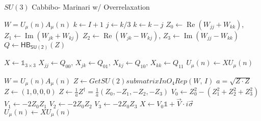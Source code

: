 \documentclass[a4paper,10pt]{article}
\begin{document}
\begin{algorithm}[H]
\caption{$SU(3)$ Cabbibo- Marinari w/ Overrelaxation}\label{alg:HBplusOR}
\begin{algorithmic}



\State $W = U_\mu(n)A_\mu(n)$
  \State $k \gets I+1$
\State $j \gets k / 3$ 
\State $k \gets k - j$ 
\State $Z_0 \gets \operatorname{Re}\left( W_{jj} + W_{kk} \right)$, $Z_1 \gets \operatorname{Im}\left( W_{jk} + W_{kj} \right)$
\State $Z_2 \gets \operatorname{Re}\left( W_{jk} - W_{kj} \right)$, $Z_3\gets \operatorname{Im}\left( W_{jj} - W_{kk} \right)$
\EndProcedure
\State $Q \gets \mathsf{HB_{SU(2)}} \left( Z \right)$ 

\State $X \gets \mathbb{1}_{3\times 3}$
\State $X_{jj} \gets Q_{00},\,X_{jk} \gets Q_{01},\,X_{kj} \gets Q_{10},\,X_{kk} \gets Q_{11}$
\State $U_\mu(n) \gets XU_\mu(n)$
\EndFor
\EndFor




\State $W = U_\mu(n)A_\mu(n)$
\State $Z \gets GetSU(2)submatrixInO_4Rep(W,\, I)$
\State $a=\sqrt{Z\cdot Z}$
\State $Z \gets (1,0,0,0)$
\Else
\State $Z \gets \frac{1}{a}Z^\dagger = \frac{1}{a}\left( Z_0,-Z_1,-Z_2,-Z_3 \right)$
\State{}
\State $V_0 \gets Z_0^2-(Z_1^2+Z_2^2+Z_3^2)$
\State $V_1 \gets -2Z_0Z_1$
\State $V_2 \gets -2Z_0Z_2$
\State $V_3 \gets -2Z_0Z_3$
\State $X \gets V_0\mathbb{1}+\vec{V}\cdot i\vec{\sigma}$
\State $U_\mu(n) \gets XU_\mu(n)$
\EndIf
\EndFor
\EndFor
\EndWhile
\EndWhile
\end{algorithmic}
\end{algorithm}
\end{document}
